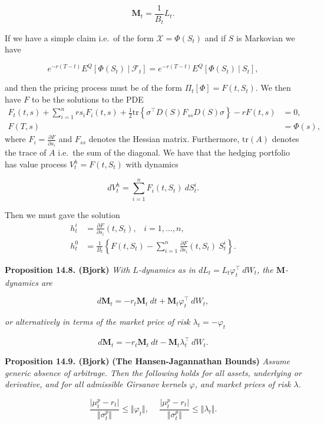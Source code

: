 \documentclass[
]{book}
\begin{document}
\[
\mathbf{M}_t=\frac{1}{B_t}L_t.
\]

If we have a simple claim i.e.~of the form \(\mathcal{X}=\Phi(S_t)\) and if \(S\) is Markovian we have

\[
e^{-r(T-t)}E^Q[\Phi(S_t)\ \vert\ \mathcal{F}_t]=e^{-r(T-t)}E^Q[\Phi(S_t)\ \vert\ S_t],
\]

and then the pricing process must be of the form \(\Pi_t[\Phi]=F(t,S_t)\). We then have \(F\) to be the solutions to the PDE
\begin{align*}
F_t(t,s)+\sum_{i=1}^nrs_iF_i(t,s)+\frac{1}{2}\text{tr}\left\{\sigma^\top D(S)F_{ss}D(S)\sigma\right\}-rF(t,s)&=0,\tag{14.31}\\
F(T,s)&=\Phi(s),\tag{14.31}
\end{align*}
where \(F_i=\frac{\partial F}{\partial s_i}\) and \(F_{ss}\) denotes the Hessian matrix. Furthermore, \(\text{tr}(A)\) denotes the trace of \(A\) i.e.~the sum of the diagonal. We have that the hedging portfolio has value process \(V_t^h=F(t,S_t)\) with dynamics

\[
dV_t^h=\sum_{i=1}^n F_i(t,S_t)\ dS_t^i.
\]

Then we must gave the solution
\begin{align*}
h_t^i&=\frac{\partial F}{\partial s_i}(t,S_t),\hspace{10pt}i=1,...,n,\tag{14.32}\\
h_t^0&=\frac{1}{B_t}\left\{F(t,S_t)-\sum_{i=1}^n \frac{\partial F}{\partial s_i}(t,S_t)\ S_t^i\right\}.\tag{14.33}
\end{align*}

\textbf{Proposition 14.8. (Bjork)} \emph{With \(L\)-dynamics as in \(dL_t=L_t\varphi^\top_t\ dW_t\), the \(\mathbf{M}\)-dynamics are}

\[
d\mathbf{M}_t=-r_t\mathbf{M}_t\ dt+\mathbf{M}_t\varphi_t^\top\ dW_t,\tag{14.39}
\]

\emph{or alternatively in terms of the market price of risk \(\lambda_t=-\varphi_t\)}

\[
d\mathbf{M}_t=-r_t\mathbf{M}_t\ dt-\mathbf{M}_t\lambda_t^\top\ dW_t.\tag{14.40}
\]

\textbf{Proposition 14.9. (Bjork)} \textbf{(The Hansen-Jagannathan Bounds)} \emph{Assume generic absence of arbitrage. Then the following holds for all assets, underlying or derivative, and for all admissible Girsanov kernels \(\varphi\), and market prices of risk \(\lambda\).}

\[
\frac{\vert \mu_t^p - r_t\vert}{\Vert \sigma_t ^p\Vert}\le \Vert \varphi_t\Vert,\hspace{15pt} \frac{\vert \mu_t^p - r_t\vert}{\Vert \sigma_t ^p\Vert}\le \Vert \lambda_t\Vert.\tag{14.42}
\]
\end{document}

